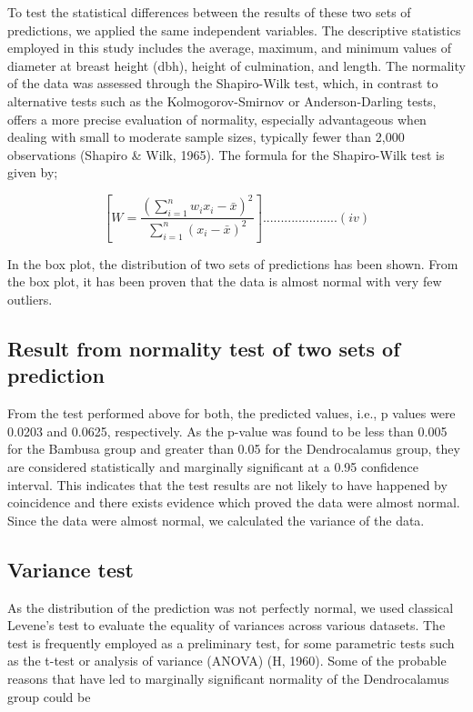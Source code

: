 \documentclass[preprint, 3p,
authoryear]{elsarticle} %
\begin{document}
To test the statistical differences between the results of these two
sets of predictions, we applied the same independent variables. The
descriptive statistics employed in this study includes the average,
maximum, and minimum values of diameter at breast height (dbh), height
of culmination, and length. The normality of the data was assessed
through the Shapiro-Wilk test, which, in contrast to alternative tests
such as the Kolmogorov-Smirnov or Anderson-Darling tests, offers a more
precise evaluation of normality, especially advantageous when dealing
with small to moderate sample sizes, typically fewer than 2,000
observations (Shapiro \& Wilk, 1965). The formula for the Shapiro-Wilk
test is given by;

\[[ W = \frac{{\left(\sum_{i=1}^{n} w_i x_i - \bar{x}\right)^2}}{{\sum_{i=1}^{n} (x_i - \bar{x})^2}}].....................(iv)\]

In the box plot, the distribution of two sets of predictions has been
shown. From the box plot, it has been proven that the data is almost
normal with very few outliers.

\hypertarget{result-from-normality-test-of-two-sets-of-prediction}{%
\subsection{Result from normality test of two sets of
prediction}\label{result-from-normality-test-of-two-sets-of-prediction}}

From the test performed above for both, the predicted values, i.e., p
values were 0.0203 and 0.0625, respectively. As the p-value was found to
be less than 0.005 for the Bambusa group and greater than 0.05 for the
Dendrocalamus group, they are considered statistically and marginally
significant at a 0.95 confidence interval. This indicates that the test
results are not likely to have happened by coincidence and there exists
evidence which proved the data were almost normal. Since the data were
almost normal, we calculated the variance of the data.

\hypertarget{variance-test}{%
\subsection{Variance test}\label{variance-test}}

As the distribution of the prediction was not perfectly normal, we used
classical Levene's test to evaluate the equality of variances across
various datasets. The test is frequently employed as a preliminary test,
for some parametric tests such as the t-test or analysis of variance
(ANOVA) (H, 1960). Some of the probable reasons that have led to
marginally significant normality of the Dendrocalamus group could be
\end{document}
